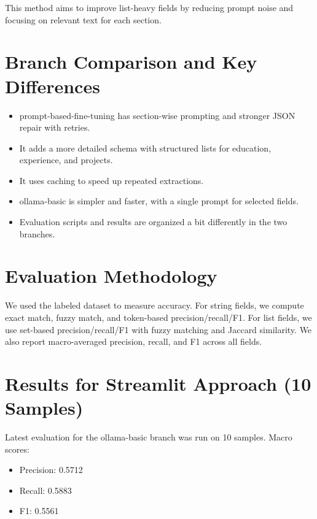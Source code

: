 \documentclass[11pt,a4paper]{article}
\begin{document}
This method aims to improve list-heavy fields by reducing prompt noise and focusing on relevant text for each section.

\section{Branch Comparison and Key Differences}
\begin{itemize}
\item prompt-based-fine-tuning has section-wise prompting and stronger JSON repair with retries.
\item It adds a more detailed schema with structured lists for education, experience, and projects.
\item It uses caching to speed up repeated extractions.
\item ollama-basic is simpler and faster, with a single prompt for selected fields.
\item Evaluation scripts and results are organized a bit differently in the two branches.
\end{itemize}

\section{Evaluation Methodology}
We used the labeled dataset to measure accuracy. For string fields, we compute exact match, fuzzy match, and token-based precision/recall/F1. For list fields, we use set-based precision/recall/F1 with fuzzy matching and Jaccard similarity. We also report macro-averaged precision, recall, and F1 across all fields.

\section{Results for Streamlit Approach (10 Samples)}
Latest evaluation for the ollama-basic branch was run on 10 samples. Macro scores:
\begin{itemize}
\item Precision: 0.5712
\item Recall: 0.5883
\item F1: 0.5561
\end{itemize}
\end{document}
